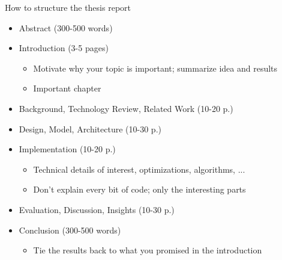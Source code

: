 \documentclass[hyperref={pdfpagelabels=false}, aspectratio=1610]{beamer}
\begin{document}
\begin{frame}
\begin{block}{How to structure the thesis report}
 \begin{itemize}
  \item Abstract (300-500 words)
  \item Introduction (3-5 pages)
  \begin{itemize}
  	\item Motivate why your topic is important; summarize idea and results
	\item Important chapter
  \end{itemize}
  \item Background, Technology Review, Related Work (10-20 p.)
  \item Design, Model, Architecture (10-30 p.)
  \item Implementation (10-20 p.)
  \begin{itemize}
   \item Technical details of interest, optimizations, algorithms, ...
   \item Don't explain every bit of code; only the interesting parts
  \end{itemize}
  \item Evaluation, Discussion, Insights (10-30 p.)
  \item Conclusion (300-500 words)
  \begin{itemize}
  	\item Tie the results back to what you promised in the introduction
  \end{itemize}
 \end{itemize}
\end{block}
\end{frame}


\end{document}
